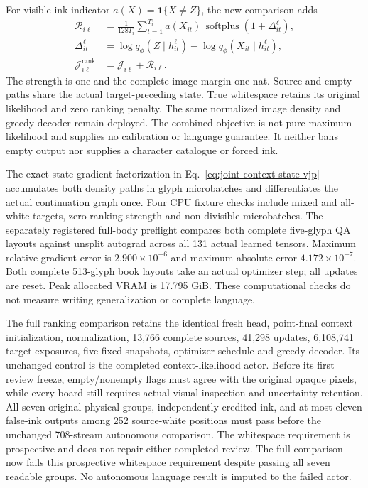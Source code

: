 For visible-ink indicator $a(X)=\mathbf1\{X\ne Z\}$, the new comparison adds
\begin{equation}
 \begin{aligned}
 \mathcal R_{i\ell}
 &=\frac1{128T_i}\sum_{t=1}^{T_i} a(X_{it})\,
     \operatorname{softplus}\!\left(1+\Delta_{it}^{\ell}\right),\\
 \Delta_{it}^{\ell}
 &=\log q_\phi(Z\mid h_{it}^{\ell})
    -\log q_\phi(X_{it}\mid h_{it}^{\ell}),\\
 \mathcal J^{\mathrm{rank}}_{i\ell}
 &=\mathcal J_{i\ell}+\mathcal R_{i\ell}.
 \end{aligned}
 \label{eq:whole-glyph-ranking}
\end{equation}
The strength is one and the complete-image margin one nat. Source and empty
paths share the actual target-preceding state. True whitespace retains its
original likelihood and zero ranking penalty. The same normalized image
density and greedy decoder remain deployed. The combined objective is not
pure maximum likelihood and supplies no calibration or language guarantee.
It neither bans empty output nor supplies a character catalogue or forced ink.

The exact state-gradient factorization in Eq.~\ref{eq:joint-context-state-vjp}
accumulates both density paths in glyph microbatches and differentiates the
actual continuation graph once. Four CPU fixture checks include mixed and
all-white targets, zero ranking strength and non-divisible microbatches.
The separately registered full-body preflight compares both complete
five-glyph QA layouts against unsplit autograd across all 131 actual learned
tensors. Maximum relative gradient error is $2.900\times10^{-6}$ and maximum
absolute error $4.172\times10^{-7}$. Both complete 513-glyph book layouts take
an actual optimizer step; all updates are reset. Peak allocated VRAM is
17.795 GiB. These computational checks do not measure writing generalization
or complete language.

The full ranking comparison retains the identical fresh head, point-final
context initialization, normalization, 13,766 complete sources, 41,298 updates,
6,108,741 target exposures, five fixed snapshots, optimizer schedule and
greedy decoder. Its unchanged control is the completed context-likelihood
actor. Before its first review freeze, empty/nonempty flags must agree with
the original opaque pixels, while every board still requires actual visual
inspection and uncertainty retention. All seven original physical groups,
independently credited ink, and at most eleven false-ink outputs among 252
source-white positions must pass before the unchanged 708-stream autonomous
comparison. The whitespace requirement is prospective and does not repair
either completed review. The full comparison now fails this prospective
whitespace requirement despite passing all seven readable groups. No autonomous
language result is imputed to the failed actor.
